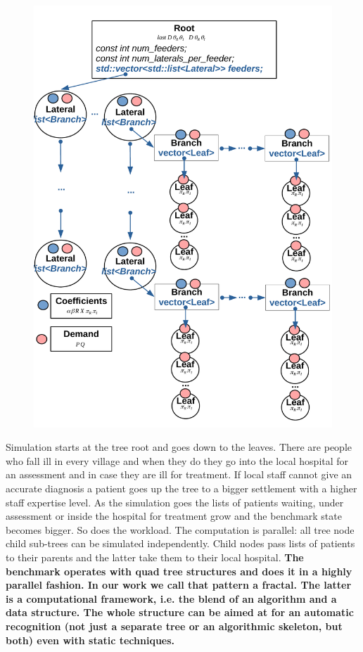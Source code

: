\begin{figure}
\begin{minipage}{.5\textwidth}
  \includegraphics[width=0.9\linewidth]{images/power_scheme.pdf}
  \label{fig:power_benchmark}
\end{minipage}
\end{figure}
\quad Simulation starts at the tree root and goes down to the leaves. There are people who fall ill in every village and when they do they go into the local hospital for an assessment and in case they are ill for treatment. If local staff cannot give an accurate diagnosis a patient goes up the tree to a bigger settlement with a higher staff expertise level. As the simulation goes the lists of patients waiting, under assessment or inside the hospital for treatment grow and the benchmark state becomes bigger. So does the workload. The computation is parallel: all tree node child sub-trees can be simulated independently. Child nodes pass lists of patients to their parents and the latter take them to their local hospital.     
\textbf{The benchmark operates with quad tree structures and does it in a highly parallel fashion. In our work we call that pattern a fractal. The latter is a computational framework, i.e. the blend of an algorithm and a data structure. The whole structure can be aimed at for an automatic recognition (not just a separate tree or an algorithmic skeleton, but both) even with static techniques.}
